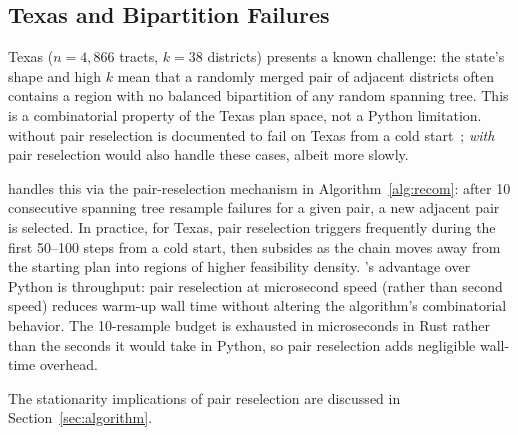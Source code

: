 \subsection{Texas and Bipartition Failures}
\label{ssec:tx-impl}

Texas ($n = 4{,}866$ tracts, $k = 38$ districts) presents a known
challenge: the state's shape and high $k$ mean that a randomly merged
pair of adjacent districts often contains a region with no balanced
bipartition of any random spanning tree.
This is a combinatorial property of the Texas plan space, not a Python
limitation.
\gc{} without pair reselection is documented to fail on Texas from a cold
start~\citep{gerrychain2021}; \gc{} \emph{with} pair reselection would
also handle these cases, albeit more slowly.

\re{} handles this via the pair-reselection mechanism in
Algorithm~\ref{alg:recom}: after 10 consecutive spanning tree resample
failures for a given pair, a new adjacent pair is selected.
In practice, for Texas, pair reselection triggers frequently during the
first 50--100 steps from a cold start, then subsides as the chain moves
away from the starting plan into regions of higher feasibility density.
\re{}'s advantage over Python \gc{} is throughput: pair reselection at
microsecond speed (rather than second speed) reduces warm-up wall time
without altering the algorithm's combinatorial behavior.
The 10-resample budget is exhausted in microseconds in Rust rather than
the seconds it would take in Python, so pair reselection adds negligible
wall-time overhead.

The stationarity implications of pair reselection are discussed in
Section~\ref{sec:algorithm}.
